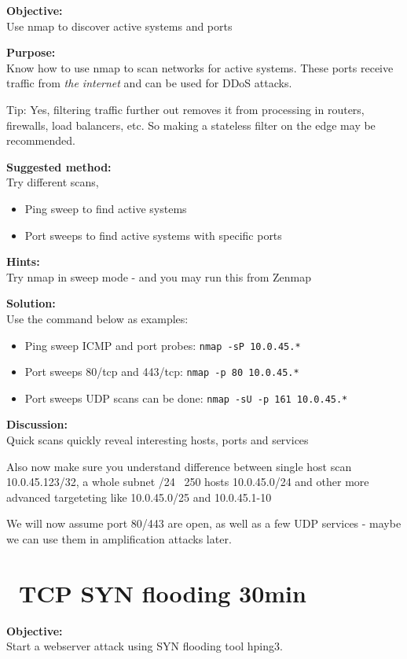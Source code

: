 \documentclass[a4paper,11pt,notitlepage]{report}
\begin{document}
{\bf Objective:}\\
Use nmap to discover active systems and ports

{\bf Purpose:}\\
Know how to use nmap to scan networks for active systems. These ports receive traffic from \emph{the internet} and can be used for DDoS attacks.

Tip: Yes, filtering traffic further out removes it from processing in routers, firewalls, load balancers, etc. So making a stateless filter on the edge may be recommended.

{\bf Suggested method:}\\
Try different scans,
\begin{itemize}
\item Ping sweep to find active systems
\item Port sweeps to find active systems with specific ports
\end{itemize}

{\bf Hints:} \\
Try nmap in sweep mode - and you may run this from Zenmap

{\bf Solution:}\\
Use the command below as examples:
\begin{itemize}
\item Ping sweep ICMP and port probes: \verb+nmap -sP 10.0.45.*+
\item Port sweeps 80/tcp and 443/tcp: \verb+nmap -p 80 10.0.45.*+
\item Port sweeps UDP scans can be done: \verb+nmap -sU -p 161 10.0.45.*+
\end{itemize}

{\bf Discussion:}\\
Quick scans quickly reveal interesting hosts, ports and services

Also now make sure you understand difference between single host scan
10.0.45.123/32, a whole subnet /24 ~250 hosts 10.0.45.0/24 and other more advanced targeteting like 10.0.45.0/25 and 10.0.45.1-10

We will now assume port 80/443 are open, as well as a few UDP services - maybe we can use them in amplification attacks later.

\chapter{\faInfoCircle\ TCP SYN flooding 30min}
\label{ex:syn-flood}

{\bf Objective:}\\
Start a webserver attack using SYN flooding tool hping3.
\end{document}
